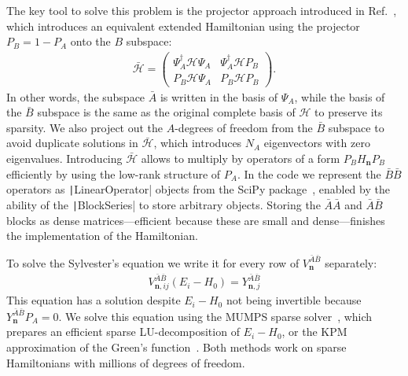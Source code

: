 The key tool to solve this problem is the projector approach introduced in Ref.~\cite{Irfan_2019}, which introduces an equivalent extended Hamiltonian using the projector $P_B = 1 - P_A$ onto the $B$ subspace:
%
\begin{align}
\bar{\mathcal{H}} = \begin{pmatrix}
\Psi_A^\dagger \mathcal{H} \Psi_A & \Psi_A^\dagger \mathcal{H} P_B \\
P_B \mathcal{H} \Psi_A & P_B \mathcal{H} P_B
\end{pmatrix}.
\end{align}
%
In other words, the subspace $\bar{A}$ is written in the basis of $\Psi_A$, while the basis of the $\bar{B}$ subspace is the same as the original complete basis of $\mathcal{H}$ to preserve its sparsity.
We also project out the $A$-degrees of freedom from the $\bar{B}$ subspace to avoid duplicate solutions in $\bar{\mathcal{H}}$, which introduces $N_A$ eigenvectors with zero eigenvalues.
Introducing $\bar{\mathcal{H}}$ allows to multiply by operators of a form $P_B H_\mathbf{n} P_B$ efficiently by using the low-rank structure of $P_A$.
In the code we represent the $\bar{B}\bar{B}$ operators as \texttt|LinearOperator| objects from the SciPy package~\cite{Virtanen_2020}, enabled by the ability of the \texttt|BlockSeries| to store arbitrary objects.
Storing the $\bar{A}\bar{A}$ and $\bar{A}\bar{B}$ blocks as dense matrices---efficient because these are small and dense---finishes the implementation of the Hamiltonian.

To solve the Sylvester's equation we write it for every row of $V_{\mathbf{n}}^{\bar{A}\bar{B}}$ separately:
%
\begin{align}
V_{\mathbf{n}, ij}^{\bar{A}\bar{B}} (E_i - H_0) = Y^{\bar{A} \bar{B}}_{\mathbf{n}, j}
\end{align}
%
This equation has a solution despite $E_i - H_0$ not being invertible because $Y^{\bar{A}\bar{B}}_{\mathbf{n}} P_A = 0$.
We solve this equation using the MUMPS sparse solver~\cite{Amestoy_2001,Amestoy_2006}, which prepares an efficient sparse LU-decomposition of $E_i - H_0$, or the KPM approximation of the Green's function~\cite{Weisse_2006}.
Both methods work on sparse Hamiltonians with millions of degrees of freedom.
